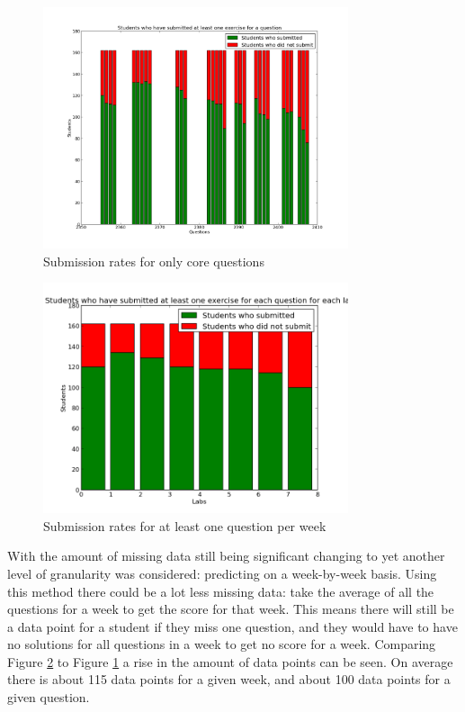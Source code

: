 \begin{figure}[b!]
\centering
\includegraphics[width=0.8\textwidth]{images/missing_data_core.png}
\caption{Submission rates for only core questions}
\label{fig:missing_data_core}
\end{figure}

\begin{figure}[b!]
\centering
\includegraphics[width=0.8\textwidth]{images/missing_data_week_any.png}
\caption{Submission rates for at least one question per week}
\label{fig:missing_data_week_any}
\end{figure}

With the amount of missing data still being significant changing to yet another level of granularity was considered: predicting on a week-by-week basis. Using this method there could be a lot less missing data: take the average of all the questions for a week to get the score for that week. This means there will still be a data point for a student if they miss one question, and they would have to have no solutions for all questions in a week to get no score for a week. Comparing Figure \ref{fig:missing_data_week_any} to Figure \ref{fig:missing_data_core} a rise in the amount of data points can be seen. On average there is about 115 data points for a given week, and about 100 data points for a given question.

